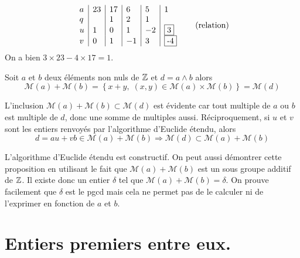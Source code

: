 \begin{propn}
\begin{multline*}
\begin{array}{l|l|l|l|l|l}
a & 23 & 17 & 6  & 5  & 1        \\ 
q &    & 1  & 2  & 1  &          \\ 
u & 1  & 0  & 1  & -2 & \fbox{3} \\
v & 0  & 1  & -1 & 3  & \fbox{-4}
\end{array}\hspace{0.5cm} \text{ (relation)}
\end{multline*}
On a bien $3\times 23 -4\times 17 = 1$.
\begin{propn}\label{sommult}
 Soit $a$ et $b$ deux éléments non nuls de $\mathbb{Z}$ et $d=a\wedge b$ alors
\begin{displaymath}
  \mathcal{M}(a) + \mathcal{M}(b) = \left\lbrace x+y,\; (x,y)\in \mathcal{M}(a)\times \mathcal{M}(b)\right\rbrace = \mathcal{M}(d)
\end{displaymath}
\end{propn}
\begin{demo}
L'inclusion $\mathcal{M}(a) + \mathcal{M}(b) \subset \mathcal{M}(d)$ est évidente car tout multiple de $a$ ou $b$ est multiple de $d$, donc une somme de multiples aussi. Réciproquement, si $u$ et $v$ sont les entiers renvoyés par l'algorithme d'Euclide étendu, alors 
\begin{displaymath}
d = au + vb \in \mathcal{M}(a) + \mathcal{M}(b) \Rightarrow \mathcal{M}(d) \subset \mathcal{M}(a) + \mathcal{M}(b)  
\end{displaymath}
\end{demo}
\begin{rem}
  L'algorithme d'Euclide étendu est constructif. On peut aussi démontrer cette proposition en utilisant le fait que $\mathcal{M}(a) + \mathcal{M}(b)$ est un sous groupe additif de $\mathbb{Z}$. Il existe donc un entier $\delta$ tel que $\mathcal{M}(a) + \mathcal{M}(b)=\mathcal{\delta}$. On prouve facilement que $\delta$ est le pgcd mais cela ne permet pas de le calculer ni de l'exprimer en fonction de $a$ et $b$.
\end{rem}


\section{Entiers premiers entre eux.}

\end{propn}

